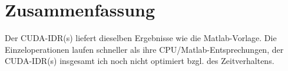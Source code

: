 \documentclass[journal]{IEEEtran}
\begin{document}
\section{Zusammenfassung}

Der CUDA-IDR(s) liefert dieselben Ergebnisse wie die Matlab-Vorlage.
Die Einzeloperationen laufen schneller als ihre CPU/Matlab-Entsprechungen,
der CUDA-IDR(s) insgesamt ich noch nicht optimiert bzgl. des Zeitverhaltens.



%





%
%
\end{document}
